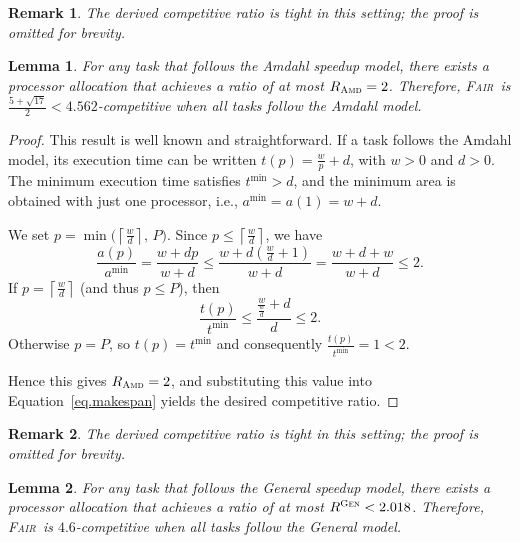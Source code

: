 \documentclass{article}
\newtheorem{lemma}{Lemma}
\newtheorem{remark}{Remark}
\newcommand\fair{\textsc{Fair}\xspace}
\newcommand\ratio{R\xspace}
\newcommand\AMD{\textsc{Amd}\xspace}
\newcommand\GEN{\textsc{Gen}\xspace}
\begin{document}
\begin{remark}
The derived competitive ratio is tight in this setting; the proof is omitted for brevity.
\end{remark}

\begin{lemma}\label{lem.amdahl}
For any task that follows the Amdahl speedup model, there exists a processor allocation that achieves a ratio of at most $\ratio_{\AMD}=2$. Therefore, \fair\ is $\frac{5+\sqrt{17}}{2} < 4.562$-competitive when all tasks follow the Amdahl model.
\end{lemma}

\begin{proof}
This result is well known and straightforward. If a task follows the Amdahl model, its execution time can be written $t(p)=\frac{w}{p}+d$, with $w>0$ and $d>0$. The minimum execution time satisfies $t^{\min}>d$, and the minimum area is obtained with just one processor, i.e., $a^{\min}=a(1)=w+d$.

We set $p=\min\!\bigl(\left\lceil \frac{w}{d} \right\rceil,\,P\bigr)$. Since $p\le\left\lceil \frac{w}{d} \right\rceil$, we have
\[
\frac{a(p)}{a^{\min}}
    =\frac{w+dp}{w+d}
    \le\frac{w+d\left(\frac{w}{d}+1\right)}{w+d}
    =\frac{w+d+w}{w+d}\le 2 .
\]
If $p=\left\lceil \tfrac{w}{d} \right\rceil$ (and thus $p\le P$), then
\[
\frac{t(p)}{t^{\min}}
    \le\frac{\frac{w}{\frac{w}{d}}+d}{d}
    \le 2 .
\]
Otherwise $p=P$, so $t(p)=t^{\min}$ and consequently $\tfrac{t(p)}{t^{\min}}=1<2$.

Hence this gives $\ratio_{\AMD}=2$, and substituting this value into Equation~\ref{eq.makespan} yields the desired competitive ratio.
\end{proof}

\begin{remark}
The derived competitive ratio is tight in this setting; the proof is omitted for brevity.
\end{remark}

\begin{lemma}\label{lem.general}
For any task that follows the General speedup model, there exists a processor allocation that achieves a ratio of at most $R^{\GEN}<2.018$. Therefore, \fair\ is $4.6$-competitive when all tasks follow the General model.
\end{lemma}
\end{document}
